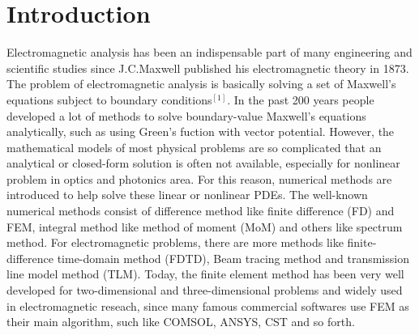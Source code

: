 \documentclass[journal]{IEEEtran}
\begin{document}
%
\IEEEpeerreviewmaketitle



\section{Introduction}
% 
% 
% 
% 
Electromagnetic analysis has been an indispensable part of many engineering and scientific studies since J.C.Maxwell published his electromagnetic theory in 1873. The problem of electromagnetic analysis is basically solving a set of Maxwell's equations subject to boundary conditions${^{[1]}}$. In the past 200 years people developed a lot of methods to solve boundary-value Maxwell's equations analytically, such as using Green's fuction with vector potential. However, the mathematical models of most physical problems are so complicated that an analytical or closed-form solution is often not available, especially for nonlinear problem in optics and photonics area. For this reason, numerical methods are introduced to help solve these linear or nonlinear PDEs. The well-known numerical methods consist of difference method like finite difference (FD) and FEM, integral method like method of moment (MoM) and others like spectrum method. For electromagnetic problems, there are more methods like finite-difference time-domain method (FDTD), Beam tracing method and transmission line model method (TLM). Today, the finite element method has been very well developed for two-dimensional and three-dimensional problems and widely used in electromagnetic reseach, since many famous commercial softwares use FEM as their main algorithm, such like COMSOL, ANSYS, CST and so forth. 
\end{document}
